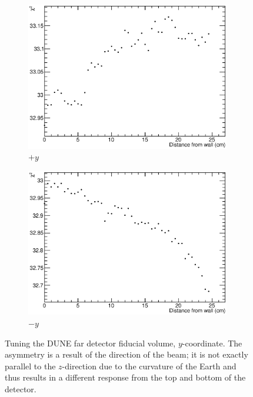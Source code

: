 \begin{figure}
  \centering
  \begin{subfigure}[t]{0.48\linewidth}
    \centering
    \includegraphics[width=0.98\textwidth]{FVTunePosY.eps}
    \caption{$+y$}
    \label{fig:FVTunePosY}
  \end{subfigure}
  \hfill
  \begin{subfigure}[t]{0.48\linewidth}
    \centering
    \includegraphics[width=0.98\textwidth]{FVTuneNegY.eps}
    \caption{$-y$}
    \label{fig:FVTuneNegY}
  \end{subfigure}
  \caption[Tuning the DUNE far detector fiducial volume, $y$-coordinate.]{Tuning the DUNE far detector fiducial volume, $y$-coordinate.  The asymmetry is a result of the direction of the beam; it is not exactly parallel to the $z$-direction due to the curvature of the Earth and thus results in a different response from the top and bottom of the detector.}
  \label{fig:FVTuneY}
\end{figure}

